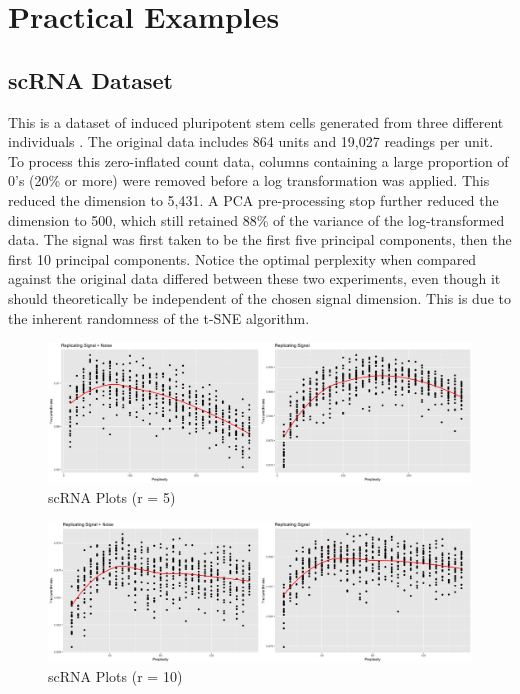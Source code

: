 \documentclass{article}
\begin{document}
\section{Practical Examples}

\subsection{scRNA Dataset}
This is a dataset of induced pluripotent stem cells generated from three different individuals \cite{scRNA data}. The original data includes 864 units and 19,027 readings per unit. To process this zero-inflated count data, columns containing a large proportion of 0's (20\% or more) were removed before a log transformation was applied. This reduced the dimension to 5,431. A PCA pre-processing stop further reduced the dimension to 500, which still retained 88\% of the variance of the log-transformed data. The signal was first taken to be the first five principal components, then the first 10 principal components. Notice the optimal perplexity when compared against the original data differed between these two experiments, even though it should theoretically be independent of the chosen signal dimension. This is due to the inherent randomness of the t-SNE algorithm.

\begin{figure}[H]
\centering
\includegraphics[scale=0.205]{trust_plot_scRNA}
\caption{scRNA Plots (r = 5)}
\end{figure}

\begin{figure}[H]
\centering
\includegraphics[scale=0.205]{trust_plot_scRNA2}
\caption{scRNA Plots (r = 10)}
\end{figure}
\end{document}
